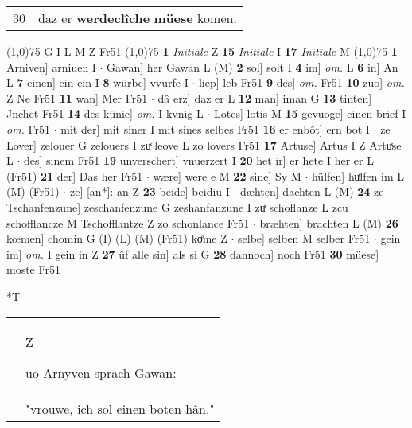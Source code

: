 \documentclass[8pt,a4paper,notitlepage]{article}
\begin{document}
\begin{table}[ht]
\begin{minipage}[t]{0.5\linewidth}
\begin{tabular}{rl}
30 & daz er \textbf{werdeclîche} \textbf{müese} komen.\\ 
\end{tabular}
\scriptsize
\line(1,0){75} \newline
G I L M Z Fr51 \newline
\line(1,0){75} \newline
\textbf{1} \textit{Initiale} Z  \textbf{15} \textit{Initiale} I  \textbf{17} \textit{Initiale} M  \newline
\line(1,0){75} \newline
\textbf{1} Arniven] arniuen I  $\cdot$ Gawan] her Gawan L (M) \textbf{2} sol] solt I \textbf{4} im] \textit{om.} L \textbf{6} in] An L \textbf{7} einen] ein ein I \textbf{8} würbe] vvurfe I  $\cdot$ liep] leb Fr51 \textbf{9} des] \textit{om.} Fr51 \textbf{10} zuo] \textit{om.} Z Ne Fr51 \textbf{11} wan] Mer Fr51  $\cdot$ dâ erz] daz er L \textbf{12} man] iman G \textbf{13} tinten] Jnchet Fr51 \textbf{14} des künic] \textit{om.} I kvnig L  $\cdot$ Lotes] lotis M \textbf{15} gevuoge] einen brief I \textit{om.} Fr51  $\cdot$ mit der] mit siner I mit sines selbes Fr51 \textbf{16} er enbôt] ern bot I  $\cdot$ ze Lover] zelouer G zelouers I zuͯ leove L zo lovers Fr51 \textbf{17} Artuse] Artus I Z Artuͯse L  $\cdot$ des] sinem Fr51 \textbf{19} unverschert] vnuerzert I \textbf{20} het ir] er hete I her er L (Fr51) \textbf{21} der] Das her Fr51  $\cdot$ wære] were e M \textbf{22} sine] Sy M  $\cdot$ hülfen] huͯlfen im L (M) (Fr51)  $\cdot$ ze] [an*]: an Z \textbf{23} beide] beidiu I  $\cdot$ dæhten] dachten L (M) \textbf{24} ze Tschanfenzune] zeschanfenzune G zeshanfanzune I zuͯ schoflanze L zcu schofflancze M Tschofflantze Z zo schonlance Fr51  $\cdot$ bræhten] brachten L (M) \textbf{26} kœmen] chomin G (I) (L) (M) (Fr51) koͤme Z  $\cdot$ selbe] selben M selber Fr51  $\cdot$ gein im] \textit{om.} I gein in Z \textbf{27} ûf alle sin] als si G \textbf{28} dannoch] noch Fr51 \textbf{30} müese] moste Fr51 \newline
\end{minipage}
\hspace{0.5cm}
\begin{minipage}[t]{0.5\linewidth}
\small
\begin{center}*T
\end{center}
\begin{tabular}{rl}
 & \begin{large}Z\end{large}uo Arnyven sprach Gawan:\\ 
 & "vrouwe, ich sol einen boten hân."\\ 

\end{tabular}
\end{minipage}
\end{table}
\end{document}

